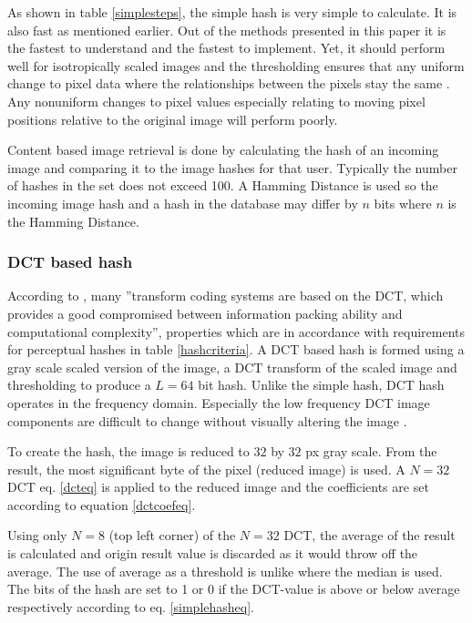 \documentclass[english,12pt,a4paper,pdftex,elec,utf8]{aaltothesis}
\begin{document}
As shown in table \ref{simplesteps}, the simple hash is very simple to calculate. It is also fast as mentioned earlier. Out of the methods presented in this paper it is the fastest to understand and the fastest to implement. Yet, it should perform well for isotropically scaled images and the thresholding ensures that any uniform change to pixel data where the relationships between the pixels stay the same \cite{Zauner2010}. Any nonuniform changes to pixel values especially relating to moving pixel positions relative to the original image will perform poorly.

Content based image retrieval is done by calculating the hash of an incoming image and comparing it to the image hashes for that user. Typically the number of hashes in the set does not exceed 100. A Hamming Distance is used so the incoming image hash and a hash in the database may differ by $n$ bits where $n$ is the Hamming Distance.


\subsubsection{DCT based hash}
According to \cite{Gonzalez2002}, many ''transform coding systems are based on the DCT, which provides a good compromised between information packing ability and computational complexity'', properties which are in accordance with requirements for perceptual hashes in table \ref{hashcriteria}. A DCT based hash is formed using a gray scale scaled version of the image, a DCT transform of the scaled image and thresholding to produce a $L=64$ bit hash. Unlike the simple hash, DCT hash operates in the frequency domain. Especially the low frequency DCT image components are difficult to change without visually altering the image \cite{Fridrich1999}.

To create the hash, the image is reduced to $32$ by $32$ px gray scale. From the result, the most significant byte of the pixel (reduced image) is used. A $N =32$ DCT eq. \ref{dcteq} is applied to the reduced image and the coefficients are set according to equation \ref{dctcoefeq}.


Using only $N = 8$ (top left corner) of the $N=32$ DCT, the average of the result is calculated and origin result value is discarded as it would throw off the average. The use of average as a threshold is unlike \cite{Coskun2004} where the median is used. The bits of the hash are set to 1 or 0 if the DCT-value is above or below average respectively according to eq. \ref{simplehasheq}.
\end{document}
